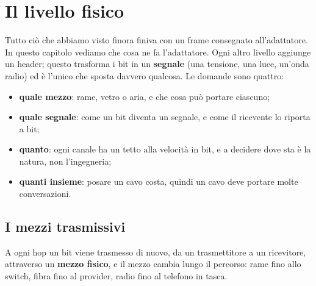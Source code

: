 \chapter{Il livello fisico}

\begin{center}
\end{center}

Tutto ciò che abbiamo visto finora finiva con un frame consegnato all'adattatore. In questo capitolo vediamo che cosa ne fa
l'adattatore. Ogni altro livello aggiunge un header; questo trasforma i bit in un \textbf{segnale} (una tensione, una luce, un'onda
radio) ed è l'unico che sposta davvero qualcosa. Le domande sono quattro:

\begin{itemize}
    \item \textbf{quale mezzo}: rame, vetro o aria, e che cosa può portare ciascuno;
    \item \textbf{quale segnale}: come un bit diventa un segnale, e come il ricevente lo riporta a bit;
    \item \textbf{quanto}: ogni canale ha un tetto alla velocità in bit, e a decidere dove sta è la natura, non l'ingegneria;
    \item \textbf{quanti insieme}: posare un cavo costa, quindi un cavo deve portare molte conversazioni.
\end{itemize}

\section{I mezzi trasmissivi}

A ogni hop un bit viene trasmesso di nuovo, da un trasmettitore a un ricevitore, attraverso un \textbf{mezzo fisico}, e il mezzo
cambia lungo il percorso: rame fino allo switch, fibra fino al provider, radio fino al telefono in tasca.

